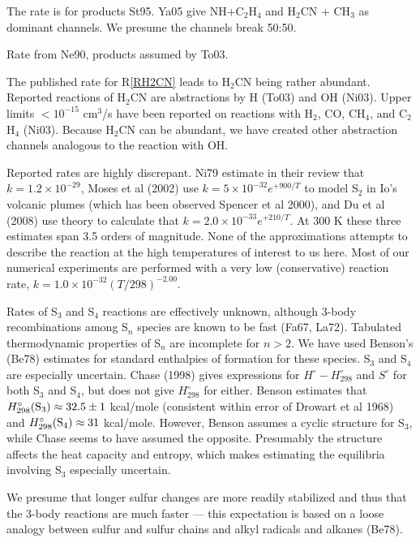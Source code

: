 \documentclass[12pt,landscape]{article}
\newcounter{reaction}
\begin{document}
   The rate is for products St95. Ya05 give NH+C$_2$H$_4$ and H$_2$CN + CH$_3$ as dominant channels.  We presume the channels break 50:50.
 
 Rate from Ne90, products assumed by To03.
 
  The published rate for R\ref{RH2CN} leads to H$_2$CN being rather abundant.  Reported reactions of H$_2$CN are abstractions by H (To03) and OH (Ni03).  Upper limits $<10^{-15}$ cm$^3$/s have been reported on reactions with H$_2$, CO, CH$_4$, and C$_2$H$_4$ (Ni03).  Because H$_2$CN can be abundant, we have created other abstraction channels analogous to the reaction with OH.  

  Reported rates are highly discrepant. 
 Ni79 estimate in their review that $k=1.2\!\times\! 10^{-29}$, Moses et al (2002) use $k=5\!\times\! 10^{-32}e^{+900/T}$ to model S$_2$ in Io's volcanic plumes (which has been observed Spencer et al 2000), and Du et al (2008) use theory to calculate that $k=2.0\!\times\! 10^{-33}e^{ +210/T}$.  At 300 K these three estimates span 3.5 orders of magnitude.
 None of the approximations attempts to describe the reaction at the high temperatures of interest to us here.  Most of our numerical experiments are performed with a 
 very low (conservative) reaction rate, $k= 1.0\!\times\! 10^{-32} \left(T/298 \right)^{-2.00}$.  
 
Rates of S$_3$ and S$_4$ reactions are effectively unknown, although 3-body recombinations among S$_n$ species are known to be fast (Fa67, La72).
Tabulated thermodynamic properties of S$_n$ are incomplete for $n>2$.  We have used Benson's (Be78) estimates for standard enthalpies of formation for these species.
S$_3$ and S$_4$ are especially uncertain. 
Chase (1998) gives expressions for $H^{\circ}-H^{\circ}_{298}$ and $S^{\circ}$ for both S$_3$ and S$_4$, but does not give $H^{\circ}_{298}$ for either.
Benson estimates that $H^{\circ}_{298}({\rm S}_3) \approx 32.5\pm 1$ kcal/mole (consistent within error of Drowart et al 1968) and $H^{\circ}_{298}({\rm S}_4)\approx 31$ kcal/mole.
However, Benson assumes a cyclic structure for S$_3$, while Chase seems to have assumed the opposite.  Presumably the structure affects the heat capacity and entropy, which makes estimating the equilibria involving S$_3$ especially uncertain.

  We presume that longer sulfur changes are more readily stabilized and thus that the 3-body reactions are much faster --- this expectation is based on a loose analogy between sulfur and sulfur chains and alkyl radicals and alkanes (Be78).
 
\end{document}
